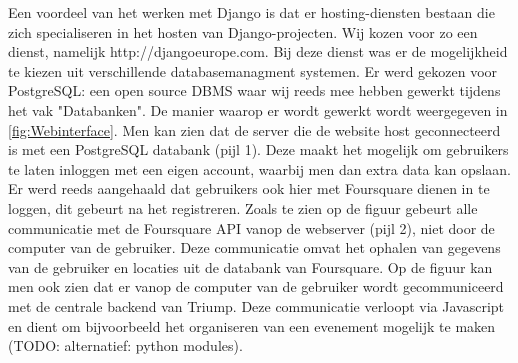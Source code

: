 Een voordeel van het werken met Django is dat er hosting-diensten bestaan die zich specialiseren in het hosten van Django-projecten. Wij kozen voor zo een dienst, namelijk http://djangoeurope.com.
Bij deze dienst was er de mogelijkheid te kiezen uit verschillende databasemanagment systemen. Er werd gekozen voor PostgreSQL: een open source DBMS waar wij reeds mee hebben gewerkt tijdens het vak "Databanken".
De manier waarop er wordt gewerkt wordt weergegeven in \ref{fig:Webinterface}. Men kan zien dat de server die de website host geconnecteerd is met een PostgreSQL databank (pijl 1). Deze maakt het mogelijk om gebruikers te laten inloggen met een eigen account, waarbij men dan extra data kan opslaan. Er werd reeds aangehaald dat gebruikers ook hier met Foursquare dienen in te loggen, dit gebeurt na het registreren. Zoals te zien op de figuur gebeurt alle communicatie met de Foursquare API vanop de webserver (pijl 2), niet door de computer van de gebruiker. Deze communicatie omvat het ophalen van gegevens van de gebruiker en locaties uit de databank van Foursquare.
Op de figuur kan men ook zien dat er vanop de computer van de gebruiker wordt gecommuniceerd met de centrale backend van Triump.
Deze communicatie verloopt via Javascript en dient om bijvoorbeeld het organiseren van een evenement mogelijk te maken (TODO: alternatief: python modules). 

